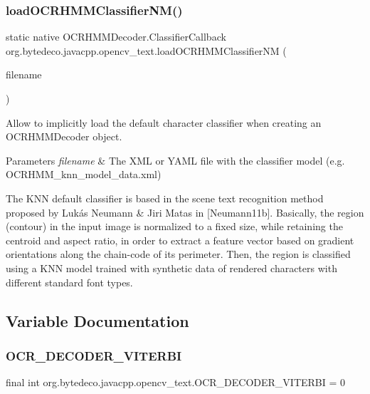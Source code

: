 \subsubsection{\texorpdfstring{load\+O\+C\+R\+H\+M\+M\+Classifier\+N\+M()}{loadOCRHMMClassifierNM()}}
{\footnotesize\ttfamily static native O\+C\+R\+H\+M\+M\+Decoder.\+Classifier\+Callback org.\+bytedeco.\+javacpp.\+opencv\+\_\+text.\+load\+O\+C\+R\+H\+M\+M\+Classifier\+NM (\begin{DoxyParamCaption}\item[{@Str Byte\+Pointer}]{filename }\end{DoxyParamCaption})\hspace{0.3cm}{\ttfamily [static]}}



Allow to implicitly load the default character classifier when creating an O\+C\+R\+H\+M\+M\+Decoder object. 


\begin{DoxyParams}{Parameters}
{\em filename} & The X\+ML or Y\+A\+ML file with the classifier model (e.\+g. O\+C\+R\+H\+M\+M\+\_\+knn\+\_\+model\+\_\+data.\+xml) \\
\hline
\end{DoxyParams}
The K\+NN default classifier is based in the scene text recognition method proposed by Lukás Neumann \& Jiri Matas in \mbox{[}Neumann11b\mbox{]}. Basically, the region (contour) in the input image is normalized to a fixed size, while retaining the centroid and aspect ratio, in order to extract a feature vector based on gradient orientations along the chain-\/code of its perimeter. Then, the region is classified using a K\+NN model trained with synthetic data of rendered characters with different standard font types. 

\subsection{Variable Documentation}
\mbox{\label{group__text__recognize_gac1843f0d2e0e7136debaa46d45446b11}} 
\subsubsection{\texorpdfstring{O\+C\+R\+\_\+\+D\+E\+C\+O\+D\+E\+R\+\_\+\+V\+I\+T\+E\+R\+BI}{OCR\_DECODER\_VITERBI}}
{\footnotesize\ttfamily final int org.\+bytedeco.\+javacpp.\+opencv\+\_\+text.\+O\+C\+R\+\_\+\+D\+E\+C\+O\+D\+E\+R\+\_\+\+V\+I\+T\+E\+R\+BI = 0\hspace{0.3cm}{\ttfamily [static]}}

